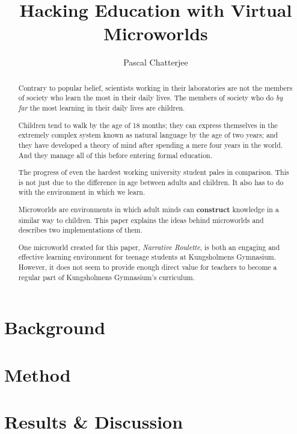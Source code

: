 \documentclass[a4paper]{report}
\title{Hacking Education with Virtual Microworlds}
\author{Pascal Chatterjee}
\date{\parbox{\linewidth}{\centering%
  \today\endgraf\bigskip
  KTH Department of Computer Science (CSC) \endgraf
  Thesis supervisor: Linda Kann}}
\begin{document}
\maketitle

\begin{abstract}
Contrary to popular belief, scientists working in their laboratories are not the members of society who learn the most in their daily lives. The members of society who do \textit{by far} the most learning in their daily lives are children. 

Children tend to walk by the age of 18 months; they can express themselves in the extremely complex system known as natural language by the age of two years; and they have developed a theory of mind after spending a mere four years in the world. And they manage all of this before entering formal education.

The progress of even the hardest working university student pales in comparison. This is not just due to the difference in age between adults and children. It also has to do with the environment in which we learn.

Microworlds are environments in which adult minds can \textbf{construct} knowledge in a similar way to children. This paper explains the ideas behind microworlds and describes two implementations of them. 

One microworld created for this paper, \textit{Narrative Roulette}, is both an engaging and effective learning environment for teenage students at Kungsholmens Gymnasium. However, it does not seem to provide enough direct value for teachers to become a regular part of Kungsholmens Gymnasium's curriculum.
\end{abstract}

\tableofcontents



\chapter{Background}







\chapter{Method}






\chapter{Results \& Discussion}







\end{document}
